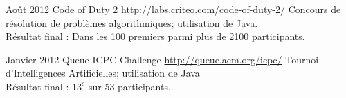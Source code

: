 \documentclass[11pt,a4paper]{moderncv}
\begin{document}
\cventry
{Août 2012}
{Code of Duty 2}
{}
{\url{http://labs.criteo.com/code-of-duty-2/}}
{}
{Concours de résolution de problèmes algorithmiques; utilisation de Java.\\Résultat final : Dans les 100 premiers parmi plus de 2100 participants.}


\cventry
{Janvier 2012}
{Queue ICPC Challenge}
{}
{\url{http://queue.acm.org/icpc/}}
{}
{Tournoi d'Intelligences Artificielles; utilisation de Java\\Résultat final : $13^{e}$ sur 53 participants.}

\renewcommand{\listitemsymbol}{-} %


\nocite{*}

\end{document}
